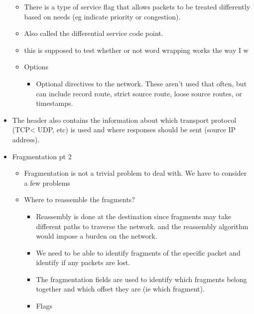 \begin{itemize}
  \begin{itemize}
  \tightlist
  \item
    There is a type of service flag that allows packets to be treated
    differently based on needs (eg indicate priority or congestion).
  \item
    Also called the differential service code point.\\
  \item
    this is supposed to test whether or not word wrapping works the way
    I w
  \item
    Options

    \begin{itemize}
    \tightlist
    \item
      Optional directives to the network. These aren't used that often,
      but can include record route, strict source route, loose source
      routes, or timestamps.
    \end{itemize}
  \end{itemize}
\item
  The header also contains the information about which transport
  protocol (TCP\textless{} UDP, etc) is used and where responses should
  be sent (source IP address).
\item
  Fragmentation pt 2

  \begin{itemize}
  \tightlist
  \item
    Fragmentation is not a trivial problem to deal with. We have to
    consider a few problems
  \item
    Where to reassemble the fragments?

    \begin{itemize}
    \tightlist
    \item
      Reassembly is done at the destination since fragments may take
      different paths to traverse the network. and the reassembly
      algorithm would impose a burden on the network.
    \item
      We need to be able to identify fragments of the specific packet
      and identify if any packets are lost.
    \item
      The fragmentation fields are used to identify which fragments
      belong together and which offset they are (ie which fragment).
    \item
      Flags


\end{itemize}
\end{itemize}
\end{itemize}

